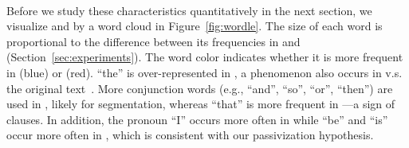 \paragraph{}

Before we study these characteristics quantitatively in the next section, we
visualize \inter{} and \trans{} by a word cloud in Figure~\ref{fig:wordle}.  The
size of each word is proportional to the difference between its frequencies in
\inter{} and \trans{} (Section~\ref{sec:experiments}).  The word color indicates
whether it is more frequent in \inter{} (blue) or \trans{} (red).  ``the'' is
over-represented in \inter{}, a phenomenon also occurs in \trans{} v.s. the
original text~\cite{eetemadi14feats}.  More conjunction words (e.g., ``and'',
``so'', ``or'', ``then'') are used in \inter{}, likely for segmentation, whereas
``that'' is more frequent in \trans{}---a sign of clauses.  In addition, the
pronoun ``I'' occurs more often in \trans{} while ``be'' and ``is'' occur more
often in \inter{}, which is consistent with our passivization hypothesis.
